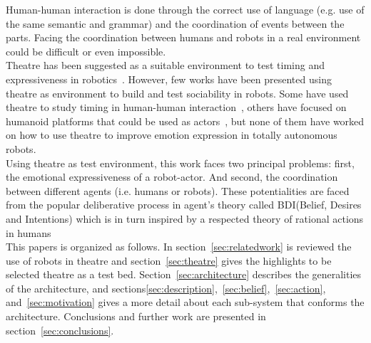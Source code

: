 Human-human interaction is done through the correct use of language (e.g. use of the same semantic and grammar) and the coordination of events between the parts. Facing the coordination between humans and robots in a real environment could be difficult or even impossible.\\
Theatre has been suggested as a suitable environment to test timing and expressiveness in robotics~\cite{Breazeal2003,Fan2013,Hoffman2009,lu2011position,Pinhanez97}. However, few works have been presented using theatre as environment to build and test sociability in robots. Some have used theatre to study timing in human-human interaction~\cite{Knight2011,Knight2011b}, others have focused on humanoid platforms that could be used as actors~\cite{Fan2009,Fan2013}, but none of them have worked on how to use theatre to improve emotion expression in totally autonomous robots.\\
Using theatre as test environment, this work faces two principal problems: first, the emotional expressiveness of a robot-actor. And second, the coordination between different agents (i.e. humans or robots). These potentialities are faced from the popular deliberative process in agent's theory called BDI(Belief, Desires and Intentions) which is in turn inspired by a respected theory of rational actions in humans\\
This papers is organized as follows. In section~\ref{sec:relatedwork} is reviewed the use of robots in theatre and section~\ref{sec:theatre} gives the highlights to be selected theatre as a test bed. Section~\ref{sec:architecture} describes the generalities of the architecture, and sections\ref{sec:description},~\ref{sec:belief},~\ref{sec:action}, and~\ref{sec:motivation} gives a more detail about each sub-system that conforms the architecture. Conclusions and further work are presented in section~\ref{sec:conclusions}. 

